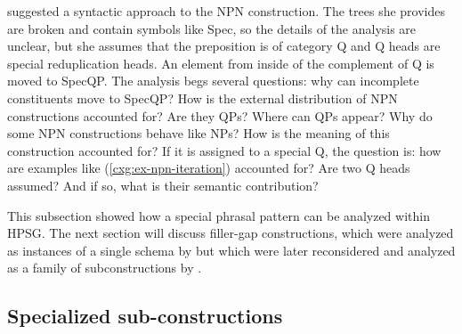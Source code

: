 \documentclass[output=paper,biblatex,babelshorthands,newtxmath,draftmode,colorlinks,citecolor=brown]{langscibook}
\begin{document}
\noindent
\citet[]{Travis2003a} suggested a syntactic approach to the NPN construction. The trees she
provides are broken and contain symbols like Spec, so the details of the analysis are unclear, but
she assumes that the preposition is of category Q and Q heads are special reduplication heads. An
element from inside of the complement of Q is moved to SpecQP. The analysis begs several questions: why can incomplete constituents
move to SpecQP? How is the external distribution of NPN constructions accounted for? Are they QPs?
Where can QPs appear? Why do some NPN constructions behave like NPs? How is the meaning of this construction accounted
for? If it is assigned to a special Q, the question is: how are examples like
(\ref{cxg:ex-npn-iteration}) accounted for? Are two Q heads assumed? And if so, what is their
semantic contribution?




This subsection showed how a special phrasal pattern can be analyzed within HPSG. The next section
will discuss filler-gap constructions, which were analyzed as instances of a single schema by
\citet[]{ps2} but which were later reconsidered and analyzed as a family of subconstructions by
.

\subsection{Specialized sub-constructions}
\end{document}
